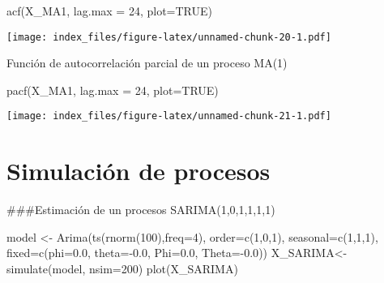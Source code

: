 \documentclass[
]{book}
\newenvironment{Shaded}{\begin{snugshade}}{\end{snugshade}}
\newcommand{\AttributeTok}[1]{\textcolor[rgb]{0.77,0.63,0.00}{#1}}
\newcommand{\ConstantTok}[1]{\textcolor[rgb]{0.00,0.00,0.00}{#1}}
\newcommand{\DecValTok}[1]{\textcolor[rgb]{0.00,0.00,0.81}{#1}}
\newcommand{\FloatTok}[1]{\textcolor[rgb]{0.00,0.00,0.81}{#1}}
\newcommand{\FunctionTok}[1]{\textcolor[rgb]{0.00,0.00,0.00}{#1}}
\newcommand{\NormalTok}[1]{#1}
\newcommand{\OtherTok}[1]{\textcolor[rgb]{0.56,0.35,0.01}{#1}}
\newcommand{\SpecialCharTok}[1]{\textcolor[rgb]{0.00,0.00,0.00}{#1}}
\begin{document}
\begin{Shaded}
\begin{Highlighting}[]
\FunctionTok{acf}\NormalTok{(X\_MA1, }\AttributeTok{lag.max =} \DecValTok{24}\NormalTok{, }\AttributeTok{plot=}\ConstantTok{TRUE}\NormalTok{)}
\end{Highlighting}
\end{Shaded}

\texttt{[image: index\_files/figure-latex/unnamed-chunk-20-1.pdf]}

Función de autocorrelación parcial de un proceso MA(1)

\begin{Shaded}
\begin{Highlighting}[]
\FunctionTok{pacf}\NormalTok{(X\_MA1, }\AttributeTok{lag.max =} \DecValTok{24}\NormalTok{, }\AttributeTok{plot=}\ConstantTok{TRUE}\NormalTok{)}
\end{Highlighting}
\end{Shaded}

\texttt{[image: index\_files/figure-latex/unnamed-chunk-21-1.pdf]}

\hypertarget{simulaciuxf3n-de-procesos}{%
\section{Simulación de procesos}\label{simulaciuxf3n-de-procesos}}

\#\#\#Estimación de un procesos SARIMA(1,0,1,1,1,1)

\begin{Shaded}
\begin{Highlighting}[]
\NormalTok{model    }\OtherTok{\textless{}{-}} \FunctionTok{Arima}\NormalTok{(}\FunctionTok{ts}\NormalTok{(}\FunctionTok{rnorm}\NormalTok{(}\DecValTok{100}\NormalTok{),}\AttributeTok{freq=}\DecValTok{4}\NormalTok{), }\AttributeTok{order=}\FunctionTok{c}\NormalTok{(}\DecValTok{1}\NormalTok{,}\DecValTok{0}\NormalTok{,}\DecValTok{1}\NormalTok{), }\AttributeTok{seasonal=}\FunctionTok{c}\NormalTok{(}\DecValTok{1}\NormalTok{,}\DecValTok{1}\NormalTok{,}\DecValTok{1}\NormalTok{),}
            \AttributeTok{fixed=}\FunctionTok{c}\NormalTok{(}\AttributeTok{phi=}\FloatTok{0.0}\NormalTok{, }\AttributeTok{theta=}\SpecialCharTok{{-}}\FloatTok{0.0}\NormalTok{, }\AttributeTok{Phi=}\FloatTok{0.0}\NormalTok{, }\AttributeTok{Theta=}\SpecialCharTok{{-}}\FloatTok{0.0}\NormalTok{))}
\NormalTok{X\_SARIMA}\OtherTok{\textless{}{-}} \FunctionTok{simulate}\NormalTok{(model, }\AttributeTok{nsim=}\DecValTok{200}\NormalTok{)}
\FunctionTok{plot}\NormalTok{(X\_SARIMA)}
\end{Highlighting}
\end{Shaded}
\end{document}
